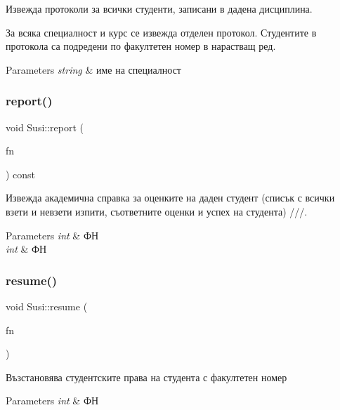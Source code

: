 Извежда протоколи за всички студенти, записани в дадена дисциплина. 

За всяка специалност и курс се извежда отделен протокол. Студентите в протокола са подредени по факултетен номер в нарастващ ред. 
\begin{DoxyParams}{Parameters}
{\em string} & име на специалност \\
\hline
\end{DoxyParams}
\mbox{\label{class_susi_a6511521c7645dc43a080c5921f037d8f}} 
\subsubsection{\texorpdfstring{report()}{report()}}
{\footnotesize\ttfamily void Susi\+::report (\begin{DoxyParamCaption}\item[{int}]{fn }\end{DoxyParamCaption}) const}



Извежда академична справка за оценките на даден студент (списък с всички взети и невзети изпити, съответните оценки и успех на студента) ///. 


\begin{DoxyParams}{Parameters}
{\em int} & ФН \\
\hline
{\em int} & ФН \\
\hline
\end{DoxyParams}
\mbox{\label{class_susi_a2294098afce61489563ac5fd9dea79ff}} 
\subsubsection{\texorpdfstring{resume()}{resume()}}
{\footnotesize\ttfamily void Susi\+::resume (\begin{DoxyParamCaption}\item[{int}]{fn }\end{DoxyParamCaption})}



Възстановява студентските права на студента с факултетен номер 


\begin{DoxyParams}{Parameters}
{\em int} & ФН \\
\hline
\end{DoxyParams}
\mbox{\label{class_susi_a98cf9bfd27148f4a3c108ff5dcc0dd25}} 
